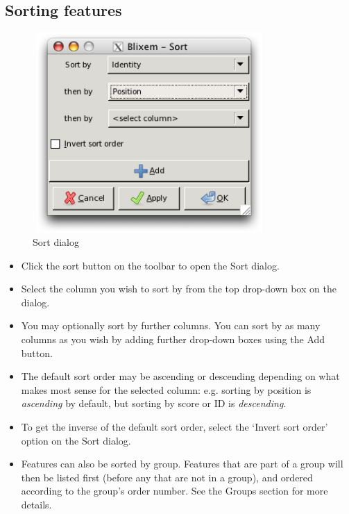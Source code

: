 \documentclass[letterpaper]{article}
\newcommand\liststyleWWviiiNumxxvi{%
\renewcommand\labelitemi{{\textbullet}}
\renewcommand\labelitemii{o}
\renewcommand\labelitemiii{[F0A7?]}
\renewcommand\labelitemiv{[F0B7?]}
}
\begin{document}
{\color[rgb]{0.30980393,0.5058824,0.7411765}\subsection[Sorting features]{Sorting features}}
\hypertarget{RefHeading2001056909880}{}\liststyleWWviiiNumxxvi

\begin{figure}
\centering
\color[rgb]{0.30980393,0.5058824,0.7411765}
\includegraphics[width=8.881cm,height=7.602cm]{img_dialog_sort.png}
\caption{Sort dialog}
\end{figure}

\liststyleWWviiiNumxxvi
\begin{itemize}
\item {Click the sort button on the toolbar to open the Sort dialog.}
\item {Select the column you wish to sort by from the top drop-down box on the dialog.}
\item {You may optionally sort by further columns. You can sort by as many columns as you wish by adding further drop-down boxes using the Add button.}
\item {The default sort order may be ascending or descending depending on what makes most sense for the selected column: e.g. sorting by position is \textit{ascending} by default, but sorting by score or ID is \textit{descending}.}
\item {To get the inverse of the default sort order, select the {\textquoteleft}Invert sort order{\textquoteright} option on the Sort dialog.}
\item {Features can also be sorted by group. Features that are part of a group will then be listed first (before any that are not in a group), and ordered according to the group{\textquoteright}s order number. See the Groups section for more details.}
\end{itemize}
\end{document}
